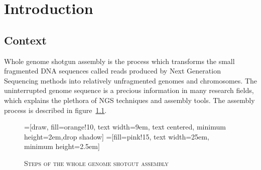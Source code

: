 \documentclass[11pt]{report}
\begin{document}
\chapter{Introduction}
\setcounter{page}{1}
\section{Context}
Whole genome shotgun assembly is the process which transforms the small fragmented DNA sequences called reads produced by Next Generation Sequencing methods into relatively unfragmented genomes and chromosomes. The uninterrupted genome sequence is a precious information in many research fields, which explains the plethora of NGS techniques and assembly tools. The assembly process is described in figure~\ref{fig:AssemblySteps}.
\begin{figure}[ht]
\caption{\textsc{Steps of the whole genome shotgut assembly}} \label{fig:AssemblySteps}
=[draw, fill=orange!10, text width=9em, 
    text centered, minimum height=2em,drop shadow]
=[fill=pink!15, text width=25em, minimum height=2.5em]
\end{figure}
\end{document}
